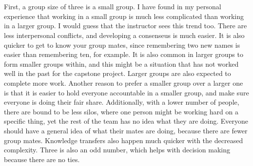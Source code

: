 \documentclass[letterpaper,12pt]{article}
\begin{document}
  \section{}
  First, a group size of three is a small group. I have found in my personal
experience that working in a small group is much less complicated than working
in a larger group. I would guess that the instructor sees this trend too.  There
are less interpersonal conflicts, and developing a consenseus is much easier. It
is also quicker to get to know your group mates, since remembering two new names
is easier than remembering ten, for example. It is also common in larger groups
to form smaller groups within, and this might be a situation that has not worked
well in the past for the capstone project. Larger groups are also expected to
complete more work. Another reason to prefer a smaller group over a larger one
is that it is easier to hold everyone accountable in a smaller group, and make
sure everyone is doing their fair share.  Additionally, with a lower number of
people, there are bound to be less silos, where one person might be working hard
on a specific thing, yet the rest of the team has no idea what they are doing.
Everyone should have a general idea of what their mates are doing,  because
there are fewer group mates.  Knowledge transfers also happen much quicker with
the decreased complexity. Three is also an odd number, which helps with decision
making because there are no ties.
\end{document}
